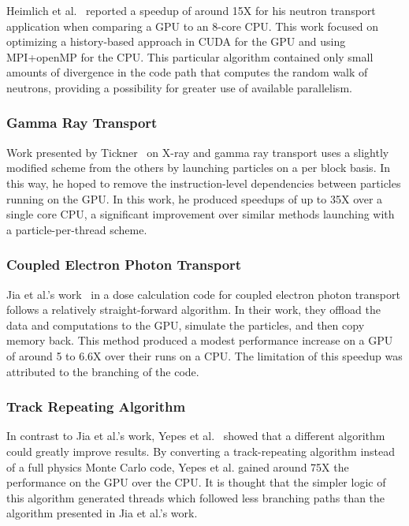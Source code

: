 Heimlich et al.~\cite{heimlich2009gpu} reported a speedup of around 15X for his neutron transport application when comparing a GPU to an 8-core CPU.
%
This work focused on optimizing a history-based approach in CUDA for the GPU and using MPI+openMP for the CPU.
%
This particular algorithm contained only small amounts of divergence in the code path that computes the random walk of neutrons, providing a possibility for greater use of available parallelism.
%


\subsubsection*{\textbf{Gamma Ray Transport}}
%
Work presented by Tickner~\cite{tickner2010monte} on X-ray and gamma ray transport uses a slightly modified scheme from the others by launching particles on a per block basis.
%
In this way, he hoped to remove the instruction-level dependencies between particles running on the GPU.
%
In this work, he produced speedups of up to 35X over a single core CPU, a significant improvement over similar methods launching with a particle-per-thread scheme.
%

\subsubsection*{\textbf{Coupled Electron Photon Transport}}
%
Jia et al.'s  work~\cite{jia2010development} in a dose calculation code for coupled electron photon transport follows a relatively straight-forward algorithm.
%
In their work, they offload the data and computations to the GPU, simulate the particles, and then copy memory back.
%
This method produced a modest performance increase on a GPU of around 5 to 6.6X over their runs on a CPU.
%
The limitation of this speedup was attributed to the branching of the code.

\subsubsection*{\textbf{Track Repeating Algorithm}}
In contrast to Jia et al.'s work, Yepes et al.~\cite{yepes2010gpu} showed that a different algorithm could greatly improve results.
%
By converting a track-repeating algorithm instead of a full physics Monte Carlo code, Yepes et al. gained around 75X the performance on the GPU over the CPU.
%
It is thought that the simpler logic of this algorithm generated threads which followed less branching paths than the algorithm presented in Jia et al.'s work.

